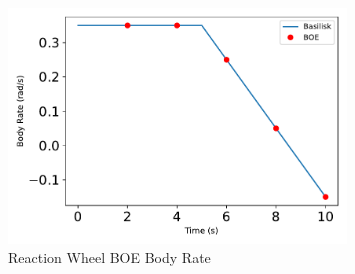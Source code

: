 \begin{figure}[htbp]\centerline{\includegraphics[width=0.8\textwidth]{AutoTeX/ReactionWheelBOEBodyRate}}\caption{Reaction Wheel BOE Body Rate}\label{fig:ReactionWheelBOEBodyRate}\end{figure}
